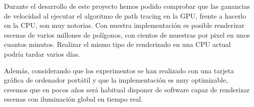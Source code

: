 Durante el desarrollo de este proyecto hemos podido comprobar que las ganancias de velocidad al ejecutar el algoritmo de path tracing en la GPU, frente a hacerlo en la CPU, son muy notorias. Con nuestra implementación es posible renderizar escenas de varios millones de polígonos, con cientos de muestras por pixel en unos cuantos minutos. Realizar el mismo tipo de renderizado en una CPU actual podría tardar varios días.

\medskip

Además, considerando que los experimentos se han realizado con una tarjeta gráfica de ordenador portátil y que la implementación es muy optimizable, creemos que en pocos años será habitual disponer de software capaz de renderizar escenas con iluminación global en tiempo real.

\nocite{Ashikhmin2000}
\nocite{Cook1984}
\nocite{Dutre2003}
\nocite{Torrance1967}
\nocite{Torrance1967}
\nocite{Veach1995}
\nocite{Walter2007}